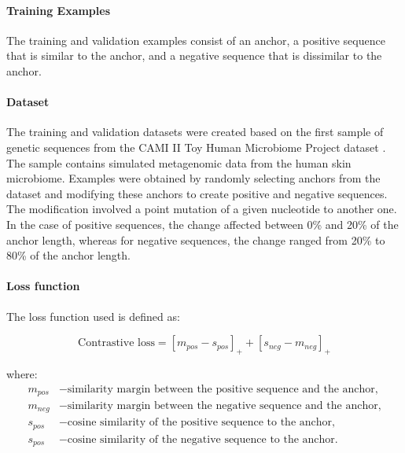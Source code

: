 \documentclass[pdflatex,sn-vancouver-num]{sn-jnl}%
\begin{document}
                \paragraph{Training Examples}
                The training and validation examples consist of an anchor, a positive sequence that is similar to the anchor, and a negative sequence that is dissimilar to the anchor.

                \paragraph{Dataset}
                The training and validation datasets were created based on the first sample of genetic sequences from the CAMI II Toy Human Microbiome Project dataset \cite{Fritz:2019}. The sample contains simulated metagenomic data from the human skin microbiome. Examples were obtained by randomly selecting anchors from the dataset and modifying these anchors to create positive and negative sequences. The modification involved a point mutation of a given nucleotide to another one. In the case of positive sequences, the change affected between 0\% and 20\% of the anchor length, whereas for negative sequences, the change ranged from 20\% to 80\% of the anchor length.

                \paragraph{Loss function}
                The loss function used is defined as:

                \begin{equation}
                    \text{Contrastive loss} = [m_{pos} - s_{pos}]_{+} + [s_{neg} - m_{neg}]_{+}
                \end{equation}

                where:
                \begin{align*}
                    m_{pos} &- \text{similarity margin between the positive sequence and the anchor,} \\
                    m_{neg} &- \text{similarity margin between the negative sequence and the anchor,} \\
                    s_{pos} &- \text{cosine similarity of the positive sequence to the anchor,} \\
                    s_{pos} &- \text{cosine similarity of the negative sequence to the anchor.} \\
                \end{align*}
                
\end{document}
